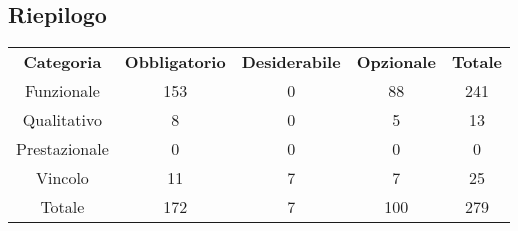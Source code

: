 \subsection{Riepilogo}

\begin{table}[H]
	\centering
	\begin{tabular}{c c c c c}
		\rowcolor{I}
		\color{white} \textbf{Categoria} &\color{white} \textbf{Obbligatorio} & \color{white}\textbf{Desiderabile} & \color{white}\textbf{Opzionale} & \color{white} \textbf{Totale} \\
		Funzionale & 153 & 0& 88 & 241\\
		Qualitativo & 8&0 & 5 & 13 \\
		Prestazionale &0 &0 &0 & 0 \\
		Vincolo &11 &7 &7 & 25 \\
		Totale & 172 & 7 & 100 & 279 \\
	\end{tabular}
\end{table}
